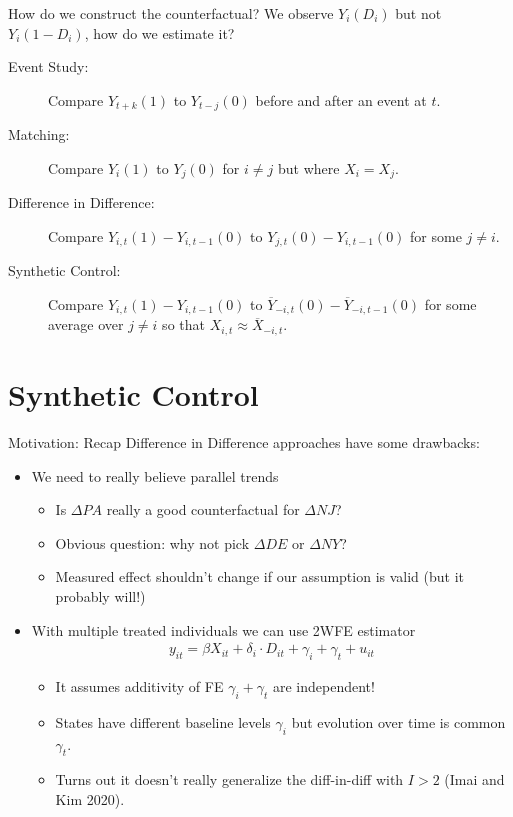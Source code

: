 \documentclass[aspectratio=169,11pt]{beamer}
\begin{document}
\begin{frame}{How do we construct the counterfactual?}
We observe $Y_i(D_i)$ but not $Y_i(1-D_i)$, how do we estimate it?\\

\begin{description}
  \item [Event Study:] Compare $Y_{t+k}(1)$ to $Y_{t-j}(0)$ before and after an event at $t$.
  \item [Matching:] Compare $Y_i(1)$ to $Y_j(0)$ for $i \neq j$ but where $X_i = X_j$.
  \item [Difference in Difference:] Compare $Y_{i,t}(1)-Y_{i,t-1}(0)$ to $Y_{j,t}(0)-Y_{i,t-1}(0)$  for some $j \neq i$.
  \item [\alert{Synthetic Control:}] Compare $Y_{i,t}(1)-Y_{i,t-1}(0)$ to $\overline{Y}_{-i,t}(0)-\overline{Y}_{-i,t-1}(0)$ for some average over $j \neq i$ so that $X_{i,t} \approx \overline{X}_{-i,t}$.

\end{description}
\end{frame}



\section{Synthetic Control}



\begin{frame}{Motivation: Recap}
Difference in Difference approaches have some drawbacks:
\begin{itemize}
\item We need to really believe \alert{parallel trends}
\begin{itemize}
\item Is $\Delta PA$ really a good counterfactual for  $\Delta NJ$?
\item Obvious question: why not pick $\Delta DE$ or $\Delta NY$?
\item Measured effect shouldn't change if our assumption is valid (but it probably will!)
\end{itemize}
\item With multiple treated individuals we can use 2WFE estimator
\begin{align*}
y_{it} = \beta X_{it} + \delta_i \cdot D_{it} +  \gamma_i + \gamma_t + u_{it}
\end{align*}
\vspace{-0.8cm}
\begin{itemize}
\item It assumes \alert{additivity} of FE $\gamma_i + \gamma_t$ are independent!
\item States have different baseline levels $\gamma_i$ but evolution over time is common $\gamma_t$.
\item Turns out it doesn't really generalize the diff-in-diff with $I > 2$ (Imai and Kim 2020).
\end{itemize}            
\end{itemize}              
\end{frame}
\end{document}
